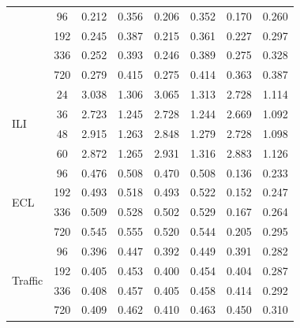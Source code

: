 \documentclass[12pt]{article}
\theoremstyle{definition}
\begin{document}
\begin{table}
\begin{tabular}{@{}lccccccc@{}}
      & 96  & 0.212 & 0.356 & 0.206 & 0.352 & 0.170 & 0.260 \\
      & 192 & 0.245 & 0.387 & 0.215 & 0.361 & 0.227 & 0.297 \\
      & 336 & 0.252 & 0.393 & 0.246 & 0.389 & 0.275 & 0.328 \\
      & 720 & 0.279 & 0.415 & 0.275 & 0.414 & 0.363 & 0.387 \\
    \midrule
    \multirow{4}{*}{ILI}
      & 24 & 3.038 & 1.306 & 3.065 & 1.313 & 2.728 & 1.114 \\
      & 36 & 2.723 & 1.245 & 2.728 & 1.244 & 2.669 & 1.092 \\
      & 48 & 2.915 & 1.263 & 2.848 & 1.279 & 2.728 & 1.098 \\
      & 60 & 2.872 & 1.265 & 2.931 & 1.316 & 2.883 & 1.126 \\
    \midrule
    \multirow{4}{*}{ECL}
      & 96  & 0.476 & 0.508 & 0.470 & 0.508 & 0.136 & 0.233 \\
      & 192 & 0.493 & 0.518 & 0.493 & 0.522 & 0.152 & 0.247 \\
      & 336 & 0.509 & 0.528 & 0.502 & 0.529 & 0.167 & 0.264 \\
      & 720 & 0.545 & 0.555 & 0.520 & 0.544 & 0.205 & 0.295 \\
    \midrule
    \multirow{4}{*}{Traffic}
      & 96  & 0.396 & 0.447 & 0.392 & 0.449 & 0.391 & 0.282 \\
      & 192 & 0.405 & 0.453 & 0.400 & 0.454 & 0.404 & 0.287 \\
      & 336 & 0.408 & 0.457 & 0.405 & 0.458 & 0.414 & 0.292 \\
      & 720 & 0.409 & 0.462 & 0.410 & 0.463 & 0.450 & 0.310 \\
    \bottomrule
  \end{tabular}
\end{table}




\end{document}
